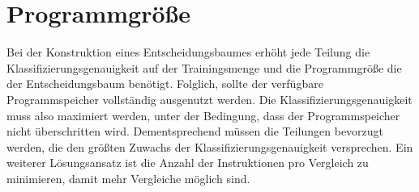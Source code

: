\section{Programmgröße}
\label{sec:eval_size}
Bei der Konstruktion eines Entscheidungsbaumes erhöht jede Teilung die Klassifizierungsgenauigkeit auf der Trainingsmenge und die Programmgröße die der Entscheidungsbaum benötigt. Folglich, sollte der verfügbare
Programmspeicher vollständig ausgenutzt werden. Die Klassifizierungsgenauigkeit muss also maximiert werden, unter der Bedingung, dass der Programmspeicher nicht überschritten wird. Dementsprechend müssen die Teilungen
bevorzugt werden, die den größten Zuwachs der Klassifizierungsgenauigkeit versprechen. Ein weiterer Lösungsansatz ist die Anzahl der Instruktionen pro Vergleich zu minimieren, damit mehr Vergleiche möglich sind.




